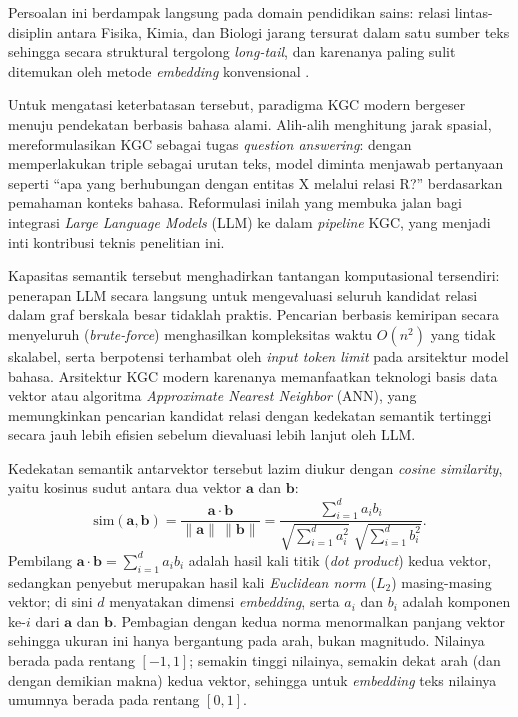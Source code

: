 \documentclass[main]{subfiles}
\begin{document}
Persoalan ini berdampak langsung pada domain pendidikan sains: relasi
lintas-disiplin antara Fisika, Kimia, dan Biologi jarang tersurat dalam
satu sumber teks sehingga secara struktural tergolong \textit{long-tail},
dan karenanya paling sulit ditemukan oleh metode \textit{embedding}
konvensional \parencite{wei_kicgpt_2023}.

Untuk mengatasi keterbatasan tersebut, paradigma KGC modern bergeser menuju pendekatan berbasis
bahasa alami. Alih-alih menghitung jarak spasial, \textcite{yao_exploring_2025}
mereformulasikan KGC sebagai tugas \textit{question answering}: dengan
memperlakukan triple sebagai urutan teks, model diminta menjawab pertanyaan
seperti ``apa yang berhubungan dengan entitas X melalui relasi R?''
berdasarkan pemahaman konteks bahasa. Reformulasi inilah yang membuka jalan
bagi integrasi \textit{Large Language Models} (LLM) ke dalam \textit{pipeline} KGC,
yang menjadi inti kontribusi teknis penelitian ini.

Kapasitas semantik tersebut menghadirkan tantangan komputasional
tersendiri: penerapan LLM secara langsung untuk mengevaluasi seluruh
kandidat relasi dalam graf berskala besar tidaklah praktis. Pencarian
berbasis kemiripan secara menyeluruh (\textit{brute-force}) menghasilkan
kompleksitas waktu $O(n^2)$ yang tidak skalabel, serta berpotensi
terhambat oleh \textit{input token limit} pada arsitektur model bahasa.
Arsitektur KGC modern karenanya memanfaatkan teknologi basis data vektor
atau algoritma \textit{Approximate Nearest Neighbor} (ANN), yang
memungkinkan pencarian kandidat relasi dengan kedekatan semantik
tertinggi secara jauh lebih efisien sebelum dievaluasi lebih lanjut oleh
LLM.

Kedekatan semantik antarvektor tersebut lazim diukur dengan \textit{cosine
similarity}, yaitu kosinus sudut antara dua vektor $\mathbf{a}$ dan $\mathbf{b}$:
\[
  \text{sim}(\mathbf{a}, \mathbf{b})
  = \frac{\mathbf{a} \cdot \mathbf{b}}{\|\mathbf{a}\|\,\|\mathbf{b}\|}
  = \frac{\sum_{i=1}^{d} a_i b_i}
         {\sqrt{\sum_{i=1}^{d} a_i^{2}}\;\sqrt{\sum_{i=1}^{d} b_i^{2}}}.
\]
Pembilang $\mathbf{a} \cdot \mathbf{b} = \sum_{i=1}^{d} a_i b_i$ adalah hasil
kali titik (\textit{dot product}) kedua vektor, sedangkan penyebut merupakan
hasil kali \textit{Euclidean norm} ($L_2$) masing-masing vektor; di sini $d$ menyatakan
dimensi \textit{embedding}, serta $a_i$ dan $b_i$ adalah komponen ke-$i$ dari
$\mathbf{a}$ dan $\mathbf{b}$. Pembagian dengan kedua norma menormalkan panjang
vektor sehingga ukuran ini hanya bergantung pada arah, bukan magnitudo.
Nilainya berada pada rentang $[-1, 1]$; semakin tinggi nilainya, semakin dekat
arah (dan dengan demikian makna) kedua vektor, sehingga untuk \textit{embedding}
teks nilainya umumnya berada pada rentang $[0, 1]$.
\end{document}
